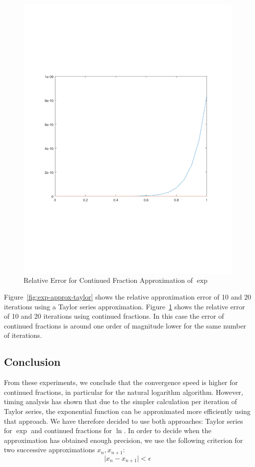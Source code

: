 \documentclass[11pt,a4paper,dvipsnames]{article}
\theoremstyle{definition}
\theoremstyle{definition}
\begin{document}
\begin{figure}[ht]
  \centering
    \includegraphics[width=\textwidth]{cf_exp}
  \caption{Relative Error for Continued Fraction Approximation of  $\exp$}
  \label{fig:exp-approx-cf}
\end{figure}

Figure~\ref{fig:exp-approx-taylor} shows the relative approximation error of 10
and 20 iterations using a Taylor series approximation. Figure~\ref{fig:exp-approx-cf}
shows the relative error of 10 and 20 iterations using continued fractions. In
this case the error of continued fractions is around one order of magnitude
lower for the same number of iterations.

\subsection{Conclusion}
\label{sec:conclusion}

From these experiments, we conclude that the convergence speed is higher for
continued fractions, in particular for the natural logarithm algorithm. However,
timing analysis has shown that due to the simpler calculation per iteration of
Taylor series, the exponential function can be approximated more efficiently
using that approach. We have therefore decided to use both approaches: Taylor series for $\exp$
and continued fractions for $\ln$.  In order to decide when the approximation has obtained enough precision,
we use the following criterion for two successive approximations $x_{n}, x_{n+1}$:
\begin{equation*}
  \vert x_{n} - x_{n+1}\vert < \epsilon
\end{equation*}
\end{document}
